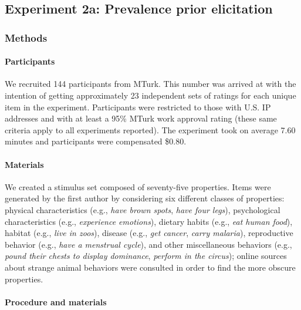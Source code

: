 \documentclass[floatsintext,doc]{apa6}
\theoremstyle{definition}
\theoremstyle{definition}
\theoremstyle{definition}
\theoremstyle{remark}
\begin{document}
\subsection{Experiment 2a: Prevalence prior
elicitation}\label{experiment-2a-prevalence-prior-elicitation}

\subsubsection{Methods}\label{methods}

\paragraph{Participants}\label{participants-2}

We recruited 144 participants from MTurk. This number was arrived at
with the intention of getting approximately 23 independent sets of
ratings for each unique item in the experiment. Participants were
restricted to those with U.S. IP addresses and with at least a 95\%
MTurk work approval rating (these same criteria apply to all experiments
reported). The experiment took on average 7.60 minutes and participants
were compensated \$0.80.

\paragraph{Materials}\label{materials}

We created a stimulus set composed of seventy-five properties. Items
were generated by the first author by considering six different classes
of properties: physical characteristics (e.g., \emph{have brown spots},
\emph{have four legs}), psychological characteristics (e.g.,
\emph{experience emotions}), dietary habits (e.g., \emph{eat human
food}), habitat (e.g., \emph{live in zoos}), disease (e.g., \emph{get
cancer}, \emph{carry malaria}), reproductive behavior (e.g., \emph{have
a menstrual cycle}), and other miscellaneous behaviors (e.g.,
\emph{pound their chests to display dominance}, \emph{perform in the
circus}); online sources about strange animal behaviors were consulted
in order to find the more obscure properties.


\paragraph{Procedure and materials}\label{procedure-and-materials-2}
\end{document}

